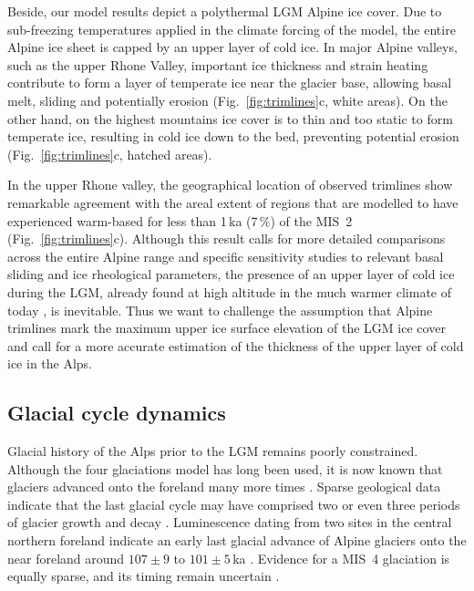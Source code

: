 \documentclass[tc, manuscript]{copernicus}
\begin{document}
    Beside, our model results depict a polythermal LGM Alpine ice cover.
    Due to sub-freezing temperatures applied in the climate forcing of the
    model, the entire Alpine ice sheet is capped by an upper layer of cold ice.
    In major Alpine valleys, such as the upper Rhone Valley, important ice
    thickness and strain heating contribute to form a layer of temperate ice
    near the glacier base, allowing basal melt, sliding and potentially
    erosion (Fig.~\ref{fig:trimlines}c, white areas). On the other hand, on the
    highest mountains ice cover is to thin and too static to form temperate
    ice, resulting in cold ice down to the bed, preventing potential erosion
    (Fig.~\ref{fig:trimlines}c, hatched areas).

    In the upper Rhone valley, the geographical location of observed trimlines
    show remarkable agreement with the areal extent of regions that are
    modelled to have experienced warm-based for less than 1\,ka (7\,\%) of the
    MIS~2 (Fig.~\ref{fig:trimlines}c). Although this result calls for more
    detailed comparisons across the
    entire Alpine range and specific sensitivity studies to relevant basal
    sliding and ice rheological parameters, the presence of an upper layer of
    cold ice during the LGM, already found at high altitude in the much warmer
    climate of today \citep{Suter.etal.2001}, is inevitable.
    Thus we want to challenge the assumption that
    Alpine trimlines mark the maximum upper ice surface elevation of the LGM
    ice cover and call for a more accurate estimation of the thickness of the
    upper layer of cold ice in the Alps.


\subsection{Glacial cycle dynamics}
\label{sec:glaciations}

    Glacial history of the Alps prior to the LGM remains poorly constrained.
    Although the four glaciations model \citep{Penck.Bruckner.1909} has long
    been used, it is now known that glaciers advanced onto the foreland many
    more times \citep{Schluchter.1991, Preusser.etal.2011}. Sparse geological
    data indicate that the last glacial cycle may have comprised two or even
    three periods of glacier growth and decay \citep{Preusser.2004,Ivy-Ochs.etal.2008}.
    Luminescence dating from two sites in the central northern foreland
    indicate an early last glacial advance of Alpine glaciers onto the near
    foreland around $107\pm9$ to $101\pm5$\,ka \citep{Preusser.etal.2003,
    Preusser.Schluchter.2004}. Evidence for a MIS~4 glaciation is equally
    sparse, and its timing remain uncertain \citep[e.g.,][]{Preusser.etal.2003,
    Link.Preusser.2006}.
\end{document}
